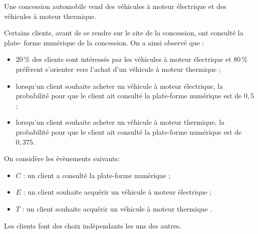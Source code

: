 \medskip

Une concession automobile vend des véhicules à moteur électrique et des véhicules à moteur thermique.

Certains clients, avant de se rendre sur le site de la concession, ont consulté la plate- forme numérique de la concession. On a ainsi observé que :
\begin{itemize}
\item[$\bullet$~~]20\,\% des clients sont intéressés par les véhicules à moteur électrique et 80\,\% préfèrent s'orienter vers l'achat d'un véhicule à moteur thermique ;
\item[$\bullet$~~]lorsqu'un client souhaite acheter un véhicule à moteur électrique, la probabilité pour que le client ait consulté la plate-forme numérique est de $0,5$ ;
\item[$\bullet$~~]lorsqu'un client souhaite acheter un véhicule à moteur thermique, la probabilité pour que le client ait consulté la plate-forme numérique est de $0,375$.
\end{itemize}

On considère les évènements suivants:


\begin{itemize}
\item[$\bullet$~~]$C$ : \og un client a consulté la plate-forme numérique \fg{} ;
\item[$\bullet$~~]$E$ : \og un client souhaite acquérir un véhicule à moteur électrique \fg{} ;
\item[$\bullet$~~]$T$ : \og un client souhaite acquérir un véhicule à moteur thermique \fg.
\end{itemize}

Les clients font des choix indépendants les uns des autres.

\medskip

